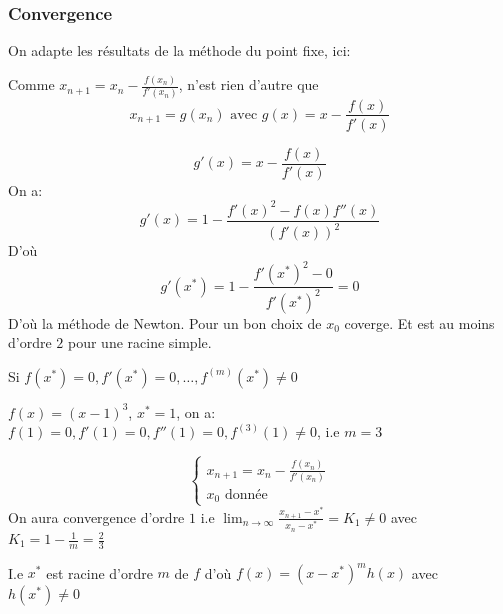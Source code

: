  \subsubsection*{Convergence}
 On adapte les résultats de la méthode du point fixe, ici:
 \par
 Comme $x_{n+1} = x_n - \frac{f(x_n)}{f'(x_n)}$, n'est rien d'autre que
 \[
 x_{n+1} = g(x_n) \text{ avec } g(x) = x - \frac{f(x)}{f'(x)}
 \] 
 \begin{remark}
    \[
    g'(x) = x - \frac{f(x)}{f'(x)}
    \]  
    On a:
    \[
    g'(x) = 1 - \frac{f'(x)^2 - f(x)f''(x)}{(f'(x))^2}
    \] 
    D'où
    \[
    g'(x^*) = 1 - \frac{f'(x^*)^2 - 0}{f'(x^*)^2} = 0
    \] 
    D'où la méthode de Newton. Pour un bon choix de $x_0$ coverge. Et est au moins d'ordre  $2$ pour une racine simple.
 \end{remark}

 \begin{remark}
     Si $f(x^*) = 0, f'(x^*) =0, \ldots, f^{(m)}(x^*) \neq 0$ 
     \begin{eg}
         $f(x) = (x - 1)^3$,  $x^* = 1$, on a: $f(1) = 0, f'(1) = 0, f''(1) = 0, f^{(3)}(1) \neq 0$, i.e $m=3$
     \end{eg}
     \[
     \begin{cases}
         x_{n+1} = x_n - \frac{f(x_n)}{f'(x_n)}\\
         x_0 \text{ donnée }
     \end{cases}
     \] 
     On aura convergence d'ordre $1$ i.e  $\lim_{n \to \infty} \frac{x_{n+1} - x^*}{x_n - x^*} = K_1 \neq 0$ avec $K_1 = 1 - \frac{1}{m} = \frac{2}{3}$ 
     \par
     I.e $x^*$ est racine d'ordre $m$ de  $f$ d'où  $f(x) = (x - x^*)^m h(x)$ avec  $h(x^*) \neq 0$
 \end{remark}
